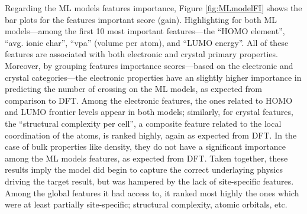 \documentclass[article]{elsarticle}
\begin{document}
Regarding the ML models features importance, Figure \ref{fig:MLmodelFI} shows the bar plots for the features important score (gain). %
Highlighting for both ML models---among the first 10 most important features---the ``HOMO element'', ``avg. ionic char'', ``vpa'' (volume per atom), and ``LUMO energy''. All of these features are associated with both electronic and crystal primary properties. Moreover, by grouping features importance scores---based on the electronic and crystal categories---the electronic properties have an slightly higher importance in predicting the number of crossing on the ML models, as expected from comparison to DFT. Among the electronic features, the ones related to HOMO and LUMO frontier levels appear in both models; similarly, for crystal features, the ``structural complexity per cell'', a composite feature related to the local coordination of the atoms, is ranked highly, again as expected from DFT. In the case of bulk properties like density, they do not have a significant importance among the ML models features, as expected from DFT. Taken together, these results imply the model did begin to capture the correct underlaying physics driving the target result, but was hampered by the lack of site-specific features. Among the global features it had access to, it ranked most highly the ones which were at least partially site-specific; structural complexity, atomic orbitals, etc. %
\end{document}
